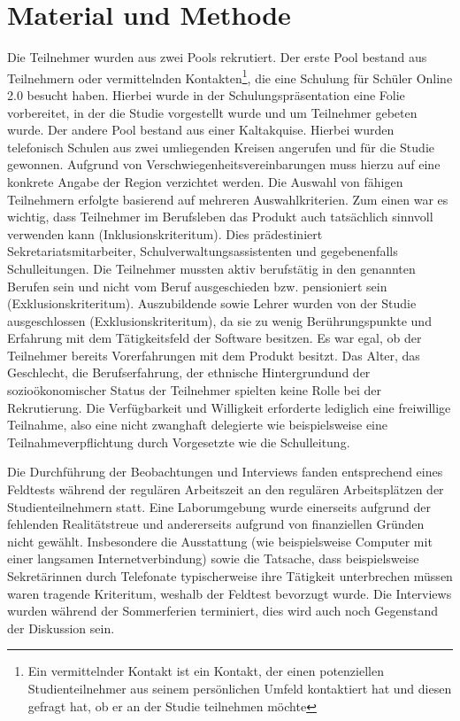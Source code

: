 \newpage
\section{Material und Methode}

Die Teilnehmer wurden aus zwei Pools rekrutiert. Der erste Pool bestand aus Teilnehmern oder vermittelnden Kontakten\footnote{Ein vermittelnder Kontakt ist ein Kontakt, der einen potenziellen Studienteilnehmer aus seinem persönlichen Umfeld kontaktiert hat und diesen gefragt hat, ob er an der Studie teilnehmen möchte}, die eine Schulung für Schüler Online 2.0 besucht haben. Hierbei wurde in der Schulungspräsentation eine Folie vorbereitet, in der die Studie vorgestellt wurde und um Teilnehmer gebeten wurde. Der andere Pool bestand aus einer Kaltakquise. Hierbei wurden telefonisch Schulen aus zwei umliegenden Kreisen angerufen und für die Studie gewonnen. Aufgrund von Verschwiegenheitsvereinbarungen muss hierzu auf eine konkrete Angabe der Region verzichtet werden.
Die Auswahl von fähigen Teilnehmern erfolgte basierend auf mehreren Auswahlkriterien. Zum einen war es wichtig, dass Teilnehmer im Berufsleben das Produkt auch tatsächlich sinnvoll verwenden kann (Inklusionskriteritum). Dies prädestiniert Sekretariatsmitarbeiter, Schulverwaltungsassistenten und gegebenenfalls Schulleitungen. Die Teilnehmer mussten aktiv berufstätig in den genannten Berufen sein und nicht vom Beruf ausgeschieden bzw. pensioniert sein (Exklusionskriteritum). Auszubildende sowie Lehrer wurden von der Studie ausgeschlossen (Exklusionskriteritum), da sie zu wenig Berührungspunkte und Erfahrung mit dem Tätigkeitsfeld der Software besitzen. Es war egal, ob der Teilnehmer bereits Vorerfahrungen mit dem Produkt besitzt. Das Alter, das Geschlecht, die Berufserfahrung, der ethnische Hintergrundund der sozioökonomischer Status der Teilnehmer spielten keine Rolle bei der Rekrutierung. 
Die Verfügbarkeit und Willigkeit erforderte lediglich eine freiwillige Teilnahme, also eine nicht zwanghaft delegierte wie beispielsweise eine Teilnahmeverpflichtung durch Vorgesetzte wie die Schulleitung.

Die Durchführung der Beobachtungen und Interviews fanden entsprechend eines Feldtests während der regulären Arbeitszeit an den regulären Arbeitsplätzen der Studienteilnehmern statt. Eine Laborumgebung wurde einerseits aufgrund der fehlenden Realitätstreue und andererseits aufgrund von finanziellen Gründen nicht gewählt. Insbesondere die Ausstattung (wie beispielsweise Computer mit einer langsamen Internetverbindung) sowie die Tatsache, dass beispielsweise Sekretärinnen durch Telefonate typischerweise ihre Tätigkeit unterbrechen müssen waren tragende Kriteritum, weshalb der Feldtest bevorzugt wurde. Die Interviews wurden während der Sommerferien terminiert, dies wird auch noch Gegenstand der Diskussion sein.

